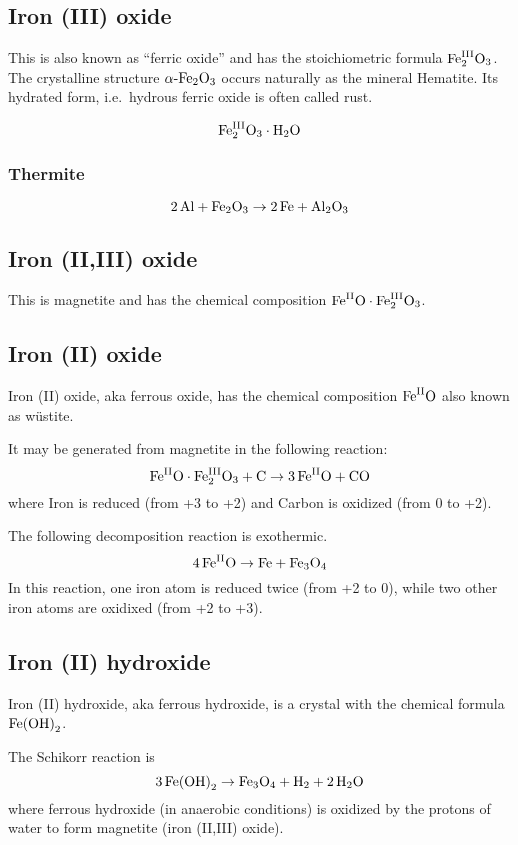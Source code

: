 \documentclass[a4paper,14pt]{extarticle}
\def\mhyphen{{\hbox{-}}}
\def\Al{{\rm Al}}
\def\H{{\rm H}}
\def\O{{\rm O}}
\def\C{{\rm C}}
\def\Fe{{\rm Fe}}
\def\II{{\rm II}}
\def\III{{\rm III}}
\begin{document}
\subsection{Iron (III) oxide}
This is also known as ``ferric oxide'' and has the stoichiometric formula $\Fe^{\III}_2\O_3$.
The crystalline structure $\alpha\mhyphen\Fe_2\O_3 $ occurs naturally as the mineral Hematite.
Its hydrated form, i.e.\ hydrous ferric oxide is often called rust.

\[
    \Fe^\III_2\O_3 \cdot \H_2\O
\]

\subsubsection{Thermite}
\[
    2\,\Al + \Fe_2\O_3 \rightarrow 2 \, \Fe + \Al_2\O_3
\]

\subsection{Iron (II,III) oxide}
This is magnetite and has the chemical composition
$\Fe^{\II}\O\cdot\Fe^{\III}_2\O_3$.

\subsection{Iron (II) oxide}
Iron (II) oxide, aka ferrous oxide, has the chemical composition $\Fe^{\II}\O$ also known as wüstite.

It may be generated from magnetite in the following reaction:
\[
    \Fe^\II\O\cdot\Fe^\III_2\O_3 + \C \rightarrow 3\,\Fe^\II\O + \C\O
\]
where Iron is reduced (from +3 to +2) and Carbon is oxidized (from 0 to +2).

The following decomposition reaction is exothermic.
\[
    4\,\Fe^\II\O \rightarrow \Fe + \Fe_3\O_4
\]
In this reaction, one iron atom is reduced twice (from +2 to 0), while two other iron atoms are oxidixed (from +2 to
+3).

\subsection{Iron (II) hydroxide}
Iron (II) hydroxide, aka ferrous hydroxide, is a crystal with the chemical formula $\Fe{(\O\H)}_2$.

The Schikorr reaction is
\[
    3 \,\Fe {(\O\H)}_2 \rightarrow \Fe_3\O_4 + \H_2 + 2\,\H_2\O
\]
where ferrous hydroxide (in anaerobic conditions) is oxidized by the protons of water to form magnetite (iron (II,III)
oxide).
\end{document}
